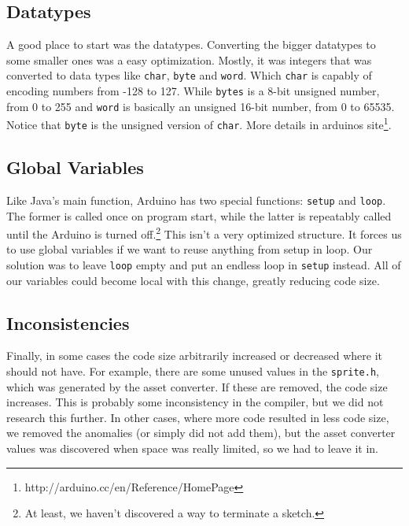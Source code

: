

\subsection*{Datatypes} %
A good place to start was the datatypes. Converting the bigger datatypes to some smaller ones was a easy optimization. Mostly, it was integers that was converted to data types like {\tt char}, {\tt byte} and {\tt word}. Which {\tt char} is capably of encoding numbers from -128 to 127. While {\tt bytes} is a 8-bit unsigned number, from 0 to 255 and {\tt word} is basically an unsigned 16-bit number, from 0 to 65535. Notice that {\tt byte} is the unsigned version of {\tt char}. More details in arduinos site\footnote{http://arduino.cc/en/Reference/HomePage}.

\subsection*{Global Variables} %
Like Java's main function, Arduino has two special functions: {\tt setup} and {\tt loop}. The former is called once on program start, while the latter is repeatably called until the Arduino is turned off.\footnote{At least, we haven't discovered a way to terminate a sketch.} This isn't a very optimized structure. It forces us to use global variables if we want to reuse anything from setup in loop. Our solution was to leave {\tt loop} empty and put an endless loop in {\tt setup} instead. All of our variables could become local with this change, greatly reducing code size.

\subsection*{Inconsistencies} %
Finally, in some cases the code size arbitrarily increased or decreased where it should not have. For example, there are some unused values in the {\tt sprite.h}, which was generated by the asset converter. If these are removed, the code size increases. This is probably some inconsistency in the compiler, but we did not research this further. In other cases, where more code resulted in less code size, we removed the anomalies (or simply did not add them), but the asset converter values was discovered when space was really limited, so we had to leave it in.
